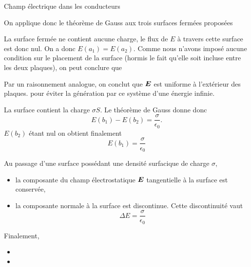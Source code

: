 \begin{corr}{Champ électrique dans les conducteurs}
\begin{corrlist}
 	 \item On applique donc le théorème de Gauss aux trois surfaces fermées
	       proposées
	       \begin{corrlist}
		       \item La surface fermée ne contient aucune charge, le flux
			     de $E$ à travers cette surface est donc nul. On a donc
			     $E(a_1) = E(a_2)$. Comme nous n'avons imposé aucune condition
			     sur le placement de la surface (hormis le fait
			     qu'elle soit incluse entre les deux plaques), on peut
			     conclure que 
		       \item Par un raisonnement analogue, on conclut que $\vece$
			     est uniforme à l'extérieur des plaques.  pour éviter la génération
		     par ce système d'une énergie infinie.
	     		\item La surface contient la charge $\sigma S$. Le théorème de
			Gauss donne donc
			\begin{equation*}
			E(b_1) - E(b_2) = \dfrac{\sigma}{\epsilon_0}.
			\end{equation*}
			$E(b_2)$ étant nul on obtient finalement
			\begin{equation*}
				E(b_1) = \dfrac{\sigma}{\epsilon_0}
			\end{equation*}
			\begin{defn}
				Au passage d'une surface possédant une densité surfacique de
				charge $\sigma$, 
				\begin{itemize}
					\item la composante du champ électrostatique
					      $\vece$ tangentielle à la surface est
					      conservée,
					 \item la composante normale à la surface est 
					       discontinue. Cette discontinuité vaut
					       \begin{equation}
						       \Delta E = \dfrac{\sigma}{\epsilon_0}
					       \end{equation}
			      \end{itemize}
			\end{defn}
			Finalement,
			\begin{itemize}
				\item {}
				\item {}
		      \end{itemize}
	       \end{corrlist}
\end{corrlist}


\end{corr}

